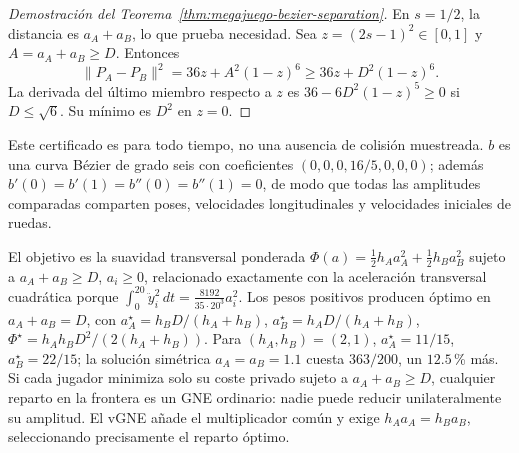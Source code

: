 \begin{proof}[Demostración del Teorema~\ref{thm:megajuego-bezier-separation}]
En $s=1/2$, la distancia es $a_A+a_B$, lo que prueba necesidad. Sea
$z=(2s-1)^2\in[0,1]$ y $A=a_A+a_B\geq D$. Entonces
\[
 \|P_A-P_B\|^2=36z+A^2(1-z)^6\geq36z+D^2(1-z)^6.
\]
La derivada del último miembro respecto a $z$ es $36-6D^2(1-z)^5\geq0$ si
$D\leq\sqrt6$. Su mínimo es $D^2$ en $z=0$.
\end{proof}

Este certificado es para todo tiempo, no una ausencia de colisión muestreada.
$b$ es una curva Bézier de grado seis con coeficientes
$(0,0,0,16/5,0,0,0)$; además $b'(0)=b'(1)=b''(0)=b''(1)=0$, de modo que todas
las amplitudes comparadas comparten poses, velocidades longitudinales y
velocidades iniciales de ruedas.

El objetivo es la suavidad transversal ponderada
$\Phi(a)=\tfrac12h_Aa_A^2+\tfrac12h_Ba_B^2$ sujeto a $a_A+a_B\geq D$,
$a_i\geq0$, relacionado exactamente con la aceleración transversal cuadrática
porque $\int_0^{20}\ddot y_i^2\,dt=\tfrac{8192}{35\cdot20^3}a_i^2$. Los pesos
positivos producen óptimo en $a_A+a_B=D$, con
$a_A^\star=h_BD/(h_A+h_B)$, $a_B^\star=h_AD/(h_A+h_B)$,
$\Phi^\star=h_Ah_BD^2/(2(h_A+h_B))$. Para $(h_A,h_B)=(2,1)$,
$a_A^\star=11/15$, $a_B^\star=22/15$; la solución simétrica
$a_A=a_B=1.1$ cuesta $363/200$, un $12.5$\,\% más. Si cada jugador minimiza
solo su coste privado sujeto a $a_A+a_B\geq D$, cualquier reparto en la
frontera es un GNE ordinario: nadie puede reducir unilateralmente su
amplitud. El vGNE añade el multiplicador común y exige $h_Aa_A=h_Ba_B$,
seleccionando precisamente el reparto óptimo.

